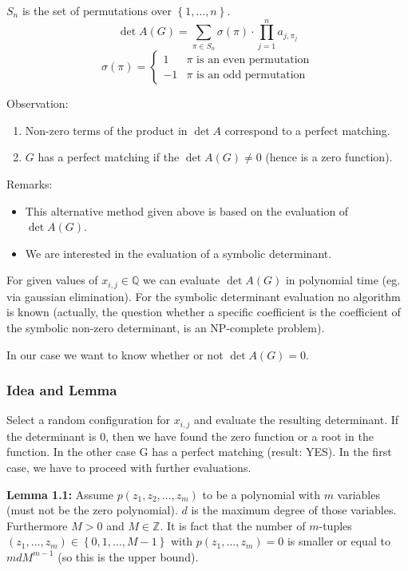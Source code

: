 \documentclass[a4paper]{article}
\newcommand{\cls}[1]{\rm{#1}}
\newcommand{\set}[1]{\left\{#1\right\}}
\begin{document}
$S_n$ is the set of permutations over $\set{1, \ldots, n}$.
\[
  \det A(G) = \sum_{\pi \in S_n} \sigma(\pi) \cdot \prod_{j=1}^n a_{j,\pi_j}
\] \[
  \sigma(\pi) = \begin{cases}
    1 & \pi \text{ is an even permutation} \\
    -1 & \pi \text{ is an odd permutation}
  \end{cases}
\]

Observation:
\begin{enumerate}
  \item Non-zero terms of the product in $\det A$ correspond to a perfect matching.
  \item $G$ has a perfect matching if the $\det A(G) \neq 0$ (hence is a zero function).
\end{enumerate}

Remarks:
\begin{itemize}
  \item This alternative method given above is based on the evaluation of $\det A(G)$.
  \item We are interested in the evaluation of a symbolic determinant.
\end{itemize}

For given values of $x_{i,j} \in \mathbb{Q}$ we can evaluate $\det A(G)$ in polynomial time (eg. via gaussian elimination).
For the symbolic determinant evaluation no algorithm is known (actually, the question whether a specific coefficient is the coefficient of the symbolic non-zero determinant, is an \cls{NP}-complete problem).

In our case we want to know whether or not $\det A(G) = 0$.

\subsubsection{Idea and Lemma}
%
Select a random configuration for $x_{i,j}$ and evaluate the resulting determinant.
If the determinant is 0, then we have found the zero function or a root in the function.
In the other case G has a perfect matching (result: YES).
In the first case, we have to proceed with further evaluations.

\textbf{Lemma 1.1:}
Assume $p(z_1, z_2, \ldots, z_m)$ to be a polynomial with $m$ variables (must not be the zero polynomial). $d$ is the maximum degree of those variables.
Furthermore $M > 0$ and $M \in \mathbb{Z}$. It is fact that the number of $m$-tuples $(z_1, \ldots, z_m) \in \set{0, 1, \ldots, M-1}$ with $p(z_1, \ldots, z_m) = 0$ is smaller or equal to $mdM^{m-1}$ (so this is the upper bound).
\end{document}
